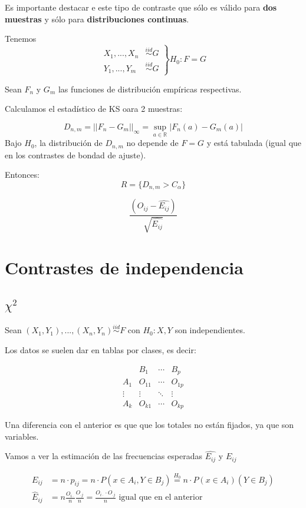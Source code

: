 Es importante destacar e este tipo de contraste que sólo es válido para \textbf{dos muestras} y sólo para \textbf{distribuciones continuas}.

Tenemos \[
\left.
\begin{array}{cc}
X_{1} ,...,X_{n} &\overset{iid}{\sim} G\\ 
Y_{1} ,...,Y_m &\overset{iid}{\sim}G
\end{array} \right\} H_0 : F = G
\]

Sean $F_n$ y $G_m$ las funciones de distribución empíricas respectivas.

Calculamos el estadístico de KS oara 2 muestras:

\[
D_{n,m} = ||F_n - G_m ||_{\infty} = \sup_{a∈ℝ} | F_n(a) - G_m(a)|
\]
Bajo $H_0$, la distribución de $D_{n,m}$ no depende de $F=G$ y está tabulada (igual que en los contrastes de bondad de ajuste).

Entonces: \[R = \{ D_{n,m} > C_α\}\]
\begin{defn}
\[
\frac{(O_{ij}-\hat{E_{ij}})}{\sqrt{\hat{E_{ij}}}}
\]
\end{defn} 

\section{Contrastes de independencia}

\subsection{$\chi^2$}

Sean $(X_1,Y_1),...,(X_n,Y_n) \overset{iid}{\sim} F$ con $H_0 : X,Y$ son independientes.

Los datos se suelen dar en tablas por clases, es decir: 

\[
\begin{array}{c|ccc}
&B_1&\cdots & B_p \\\hline
A_1 & O_{11} & \cdots & O_{1p}\\
\vdots & \vdots & \ddots & \vdots \\
A_k & O_{k1} & \cdots & O_{kp} 
\end{array}
\]

Una diferencia con el anterior es que que los totales no están fijados, ya que son variables.

Vamos a ver la estimación de las frecuencias esperadas $\hat{E_{ij}}$ y $E_{ij}$

\begin{align*}
E_{ij} &= n·p_{ij} = n·P(x∈A_i,Y∈B_j) \overset{H_0}{=} n·P(x∈A_i)(Y∈B_j)\\
\hat{E}_{ij} &= n \frac{O_{i·}}{n}\frac{O_{·j}}{n} = \frac{O_{i·}·O_{·j}}{n} \text{ igual que en el anterior}
\end{align*}

